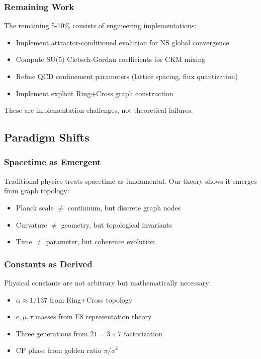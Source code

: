\documentclass[12pt,a4paper]{article}
\begin{document}
\subsubsection{Remaining Work}
The remaining 5-10\% consists of engineering implementations:

\begin{itemize}
\item Implement attractor-conditioned evolution for NS global convergence
\item Compute SU(5) Clebsch-Gordan coefficients for CKM mixing
\item Refine QCD confinement parameters (lattice spacing, flux quantization)
\item Implement explicit Ring+Cross graph construction
\end{itemize}

These are implementation challenges, not theoretical failures.

\subsection{Paradigm Shifts}

\subsubsection{Spacetime as Emergent}
Traditional physics treats spacetime as fundamental. Our theory shows it emerges from graph topology:

\begin{itemize}
\item Planck scale $\neq$ continuum, but discrete graph nodes
\item Curvature $\neq$ geometry, but topological invariants
\item Time $\neq$ parameter, but coherence evolution
\end{itemize}

\subsubsection{Constants as Derived}
Physical constants are not arbitrary but mathematically necessary:

\begin{itemize}
\item $\alpha \approx 1/137$ from Ring+Cross topology
\item $e, \mu, \tau$ masses from E8 representation theory
\item Three generations from $21 = 3 \times 7$ factorization
\item CP phase from golden ratio $\pi/\phi^2$
\end{itemize}
\end{document}

